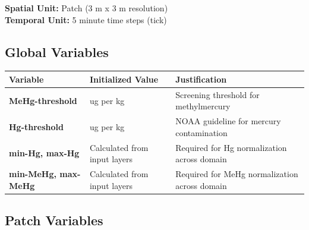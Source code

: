 \documentclass[
]{book}
\begin{document}
\textbf{Spatial Unit:} Patch (3 m x 3 m resolution)\\
\textbf{Temporal Unit:} 5 minute time steps (tick)\\

\subsection{Global Variables}\label{global-variables-4}

\begin{longtable}[]{@{}
  >{\raggedright\arraybackslash}p{}
  >{\raggedright\arraybackslash}p{}
  >{\raggedright\arraybackslash}p{}@{}}
\toprule\noalign{}
\begin{minipage}[b]{\linewidth}\raggedright
Variable
\end{minipage} & \begin{minipage}[b]{\linewidth}\raggedright
Initialized Value
\end{minipage} & \begin{minipage}[b]{\linewidth}\raggedright
Justification
\end{minipage} \\
\midrule\noalign{}
\endhead
\bottomrule\noalign{}
\endlastfoot
\textbf{MeHg-threshold} & 15 ug per kg & Screening threshold for methylmercury \citep{noaa_national_oceanic_and_atmospheric_administration_sediment_1990, gaudet_canadian_1995} \\
\textbf{Hg-threshold} & 150 ug per kg & NOAA guideline for mercury contamination \citep{noaa_national_oceanic_and_atmospheric_administration_sediment_1990, gaudet_canadian_1995} \\
\textbf{min-Hg, max-Hg} & Calculated from input layers & Required for Hg normalization across domain \\
\textbf{min-MeHg, max-MeHg} & Calculated from input layers & Required for MeHg normalization across domain \\
\end{longtable}

\subsection{Patch Variables}\label{patch-variables-4}
\end{document}
